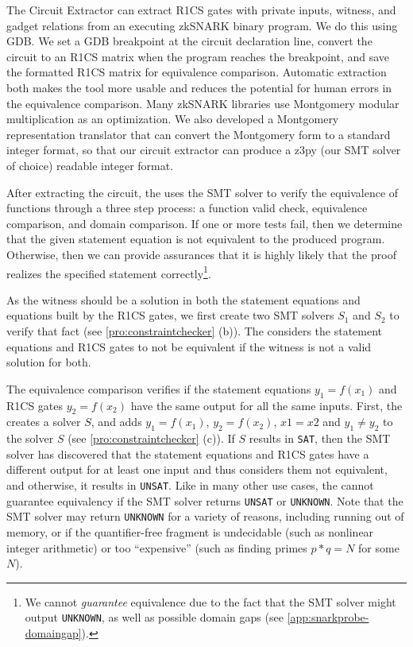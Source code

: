  The Circuit Extractor can extract R1CS gates with private inputs, witness, and gadget relations from an executing zkSNARK binary program.  We do this using GDB.  We set a GDB breakpoint at the circuit declaration line, convert the circuit to an R1CS matrix when the program reaches the breakpoint, and save the formatted R1CS matrix for equivalence comparison. Automatic extraction both makes the tool more usable and reduces the potential for human errors in the equivalence comparison. Many zkSNARK libraries use Montgomery modular multiplication as an optimization. We also developed a Montgomery representation translator that can convert the Montgomery form to a standard integer format, so that our circuit extractor can produce a z3py (our SMT solver of choice) readable integer format.

After extracting the circuit, the \ConstraintChecker uses the SMT solver to verify the equivalence of functions through a three step process: a function valid check, equivalence comparison, and domain comparison. If one or more tests fail, then we determine that the given statement equation is not equivalent to the produced program. Otherwise, then we can provide assurances that it is highly likely that the proof realizes the specified statement correctly\footnote{We cannot \textit{guarantee} equivalence due to the fact that the SMT solver might output \texttt{UNKNOWN}, as well as possible domain gaps (see \autoref{app:snarkprobe-domaingap}).}.

 As the witness should be a solution in both the statement equations and equations built by the R1CS gates, we first create two SMT solvers $S_1$ and $S_2$ to verify that fact (see \autoref{pro:constraintchecker} (b)). The \ConstraintChecker considers the statement equations and R1CS gates to not be equivalent if the witness is not a valid solution for both.


 The equivalence comparison verifies if the statement equations $y_1 = f(x_1)$ and R1CS gates $y_2 = f(x_2)$ have the same output for all the same inputs. First, the \ConstraintChecker creates a solver $S$, and adds $y_1 = f(x_1)$, $y_2 = f(x_2)$, $x1 = x2$ and $y_1 \ne y_2$ to the solver $S$ (see \autoref{pro:constraintchecker} (c)). If $S$ results in \texttt{SAT}, then the SMT solver has discovered that the statement equations and R1CS gates have a different output for at least one input and thus considers them not equivalent, and otherwise, it results in \texttt{UNSAT}. Like in many other use cases, the \ConstraintChecker cannot guarantee equivalency if the SMT solver returns \texttt{UNSAT} or \texttt{UNKNOWN}.
Note that the SMT solver may return \texttt{UNKNOWN} for a variety of reasons, including running out of memory, or if the quantifier-free fragment is undecidable (such as nonlinear integer arithmetic) or too ``expensive'' (such as finding primes $p*q = N$ for some $N$).

